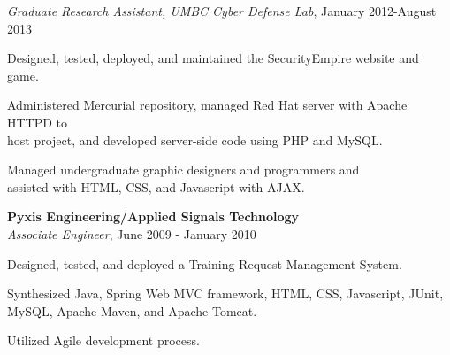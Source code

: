 \btab \textit{Graduate Research Assistant, UMBC Cyber Defense Lab}, January 2012-August 2013\\
\begin{my_list}
\item Designed, tested, deployed, and maintained the SecurityEmpire website and game.
\item Administered Mercurial repository, managed Red Hat server with Apache HTTPD to\\ \tab \tab host project, and developed server-side code using PHP and MySQL.
\item Managed undergraduate graphic designers and programmers and\\ \tab \tab assisted with HTML, CSS, and Javascript with AJAX.
\end{my_list}


\atab \textbf{Pyxis Engineering/Applied Signals Technology}\\
\btab \textit{Associate Engineer}, June 2009 - January 2010\\
\begin{my_list}
\item Designed, tested, and deployed a Training Request Management System.
\item Synthesized Java, Spring Web MVC framework, HTML, CSS, Javascript, JUnit,\\ \tab \tab MySQL, Apache Maven, and Apache Tomcat.
\item Utilized Agile development process.
\end{my_list}
\medskip

